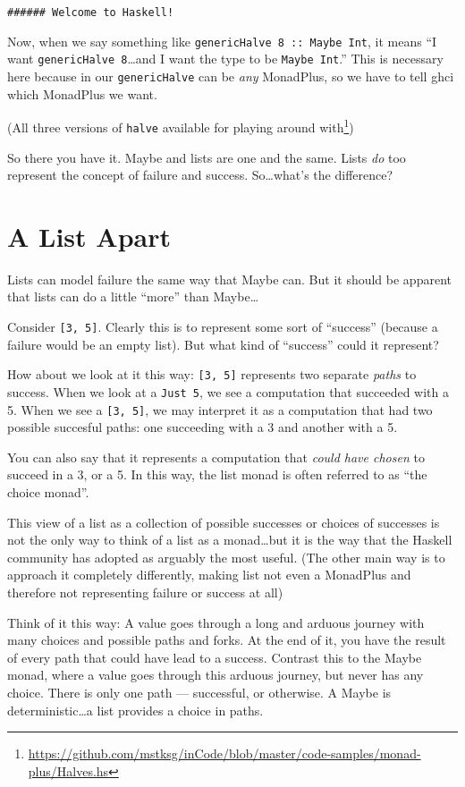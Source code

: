 \documentclass[]{article}
\renewcommand{\href}[2]{#2\footnote{\url{#1}}}
\begin{document}
\begin{verbatim}
###### Welcome to Haskell!
\end{verbatim}

Now, when we say something like
\texttt{genericHalve\ 8\ ::\ Maybe\ Int}, it means ``I want
\texttt{genericHalve\ 8}\ldots{}and I want the type to be
\texttt{Maybe\ Int}.'' This is necessary here because in our
\texttt{genericHalve} can be \emph{any} MonadPlus, so we have to tell
ghci which MonadPlus we want.

(\href{https://github.com/mstksg/inCode/blob/master/code-samples/monad-plus/Halves.hs}{All
three versions of \texttt{halve} available for playing around with})

So there you have it. Maybe and lists are one and the same. Lists
\emph{do} too represent the concept of failure and success.
So\ldots{}what's the difference?

\section{A List Apart}\label{a-list-apart}

Lists can model failure the same way that Maybe can. But it should be
apparent that lists can do a little ``more'' than Maybe\ldots{}

Consider \texttt{{[}3,\ 5{]}}. Clearly this is to represent some sort of
``success'' (because a failure would be an empty list). But what kind of
``success'' could it represent?

How about we look at it this way: \texttt{{[}3,\ 5{]}} represents two
separate \emph{paths} to success. When we look at a \texttt{Just\ 5}, we
see a computation that succeeded with a 5. When we see a
\texttt{{[}3,\ 5{]}}, we may interpret it as a computation that had two
possible succesful paths: one succeeding with a 3 and another with a 5.

You can also say that it represents a computation that \emph{could have
chosen} to succeed in a 3, or a 5. In this way, the list monad is often
referred to as ``the choice monad''.

This view of a list as a collection of possible successes or choices of
successes is not the only way to think of a list as a monad\ldots{}but
it is the way that the Haskell community has adopted as arguably the
most useful. (The other main way is to approach it completely
differently, making list not even a MonadPlus and therefore not
representing failure or success at all)

Think of it this way: A value goes through a long and arduous journey
with many choices and possible paths and forks. At the end of it, you
have the result of every path that could have lead to a success.
Contrast this to the Maybe monad, where a value goes through this
arduous journey, but never has any choice. There is only one path ---
successful, or otherwise. A Maybe is deterministic\ldots{}a list
provides a choice in paths.
\end{document}

